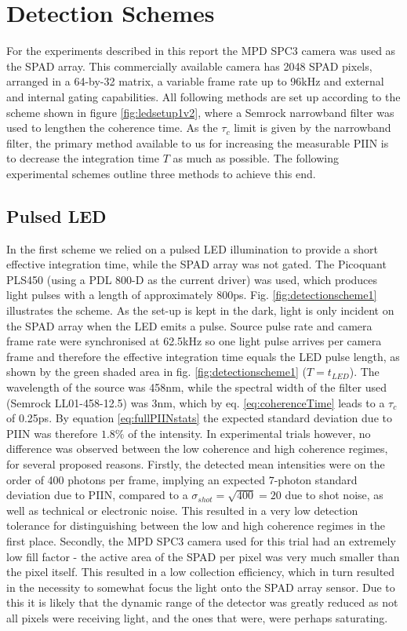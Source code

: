 \documentclass[]{article}
\begin{document}
\section{Detection Schemes}
	For the experiments described in this report the MPD SPC3 camera was used as the SPAD array. This commercially available camera has 2048 SPAD pixels, arranged in a 64-by-32 matrix, a variable frame rate up to 96kHz and external and internal gating capabilities. All following methods are set up according to the scheme shown in figure \ref{fig:ledsetup1v2}, where a Semrock narrowband filter was used to lengthen the coherence time. As the $\tau_c$ limit is given by the narrowband filter, the primary method available to us for increasing the measurable PIIN is to decrease the integration time $T$ as much as possible. The following experimental schemes outline three methods to achieve this end.
	
\subsection{Pulsed LED}\label{scheme1}
	In the first scheme we relied on a pulsed LED illumination to provide a short effective integration time, while the SPAD array was not gated. The Picoquant PLS450 (using a PDL 800-D as the current driver) was used, which produces light pulses with a length of approximately 800ps. Fig. \ref{fig:detectionscheme1} illustrates the scheme. As the set-up is kept in the dark, light is only incident on the SPAD array when the LED emits a pulse. Source pulse rate and camera frame rate were synchronised at 62.5kHz so one light pulse arrives per camera frame and therefore the effective integration time equals the LED pulse length, as shown by the green shaded area in fig. \ref{fig:detectionscheme1} ($T = t_{LED}$). The wavelength of the source was 458nm, while the spectral width of the filter used (Semrock LL01-458-12.5) was 3nm, which by eq. \ref{eq:coherenceTime} leads to a $\tau_c$ of 0.25ps. By equation \ref{eq:fullPIINstats} the expected standard deviation due to PIIN was therefore $1.8\%$ of the intensity. In experimental trials however, no difference was observed between the low coherence and high coherence regimes, for several proposed reasons. Firstly, the detected mean intensities were on the order of 400 photons per frame, implying an expected 7-photon standard deviation due to PIIN, compared to a $\sigma_{shot} = \sqrt{400}=20$ due to shot noise, as well as technical or electronic noise. This resulted in a very low detection tolerance for distinguishing between the low and high coherence regimes in the first place. Secondly, the MPD SPC3 camera used for this trial had an extremely low fill factor - the active area of the SPAD per pixel was very much smaller than the pixel itself. This resulted in a low collection efficiency, which in turn resulted in the necessity to somewhat focus the light onto the SPAD array sensor. Due to this it is likely that the dynamic range of the detector was greatly reduced as not all pixels were receiving light, and the ones that were, were perhaps saturating.
	
\end{document}
